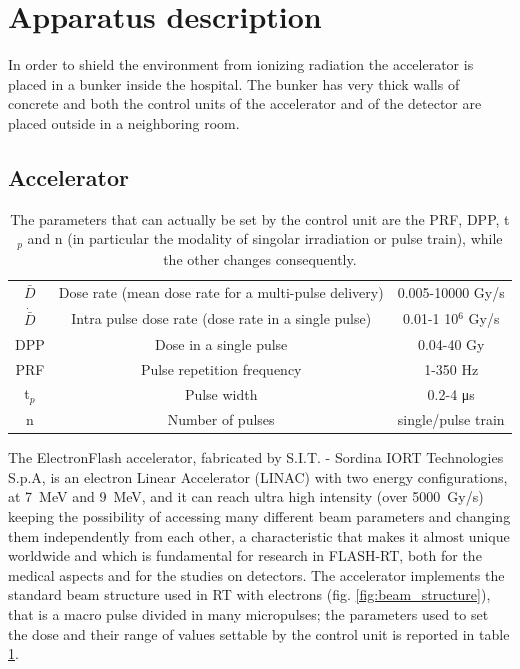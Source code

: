 \section{Apparatus description}
   In order to shield the environment from ionizing radiation the accelerator is placed in a bunker inside the hospital. The bunker has very thick walls of concrete and both the control units of the accelerator and of the detector are placed outside in a neighboring room. 
   \subsection{Accelerator}
      \begin{table}
         \begin{center}
         \begin{tabular}{| c | c | c |}
         \hline
      $\bar{D}$ & Dose rate (mean dose rate for a multi-pulse delivery) & 0.005-10000 Gy/s\\
      $\Dot{\bar{D}}$ & Intra pulse dose rate (dose rate in a single pulse) &  0.01-1 10$^6$ Gy/s  \\
      DPP & Dose in a single pulse & 0.04-40 Gy\\
      PRF & Pulse repetition frequency & 1-350 Hz\\
      t$_{p}$ & Pulse width & 0.2-4 \si{\us}\\
      n & Number of pulses & single/pulse train \\
      \hline
         \end{tabular}
         \caption{The parameters that can actually be set by the control unit are the PRF, DPP, t$_p$ and n (in particular the modality of singolar irradiation or pulse train), while the other changes consequently.}
         \label{tab:beam_parameters}
         \end{center}
      \end{table}  
      The ElectronFlash accelerator, fabricated by S.I.T. - Sordina IORT Technologies S.p.A, is an electron Linear Accelerator (LINAC) with two energy configurations, at \SI{7}{MeV} and \SI{9}{MeV}, and it can reach ultra high intensity (over \SI{5000}{Gy/s}) keeping the possibility of accessing many different beam parameters and changing them independently from each other, a characteristic that makes it almost unique worldwide and which is fundamental for research in FLASH-RT, both for the medical aspects and for the studies on detectors. 
      The accelerator implements the standard beam structure used in RT with electrons (fig. \ref{fig:beam_structure}), that is a macro pulse divided in many micropulses; the parameters used to set the dose and their range of values settable by the control unit is reported in table \ref{tab:beam_parameters}. 

